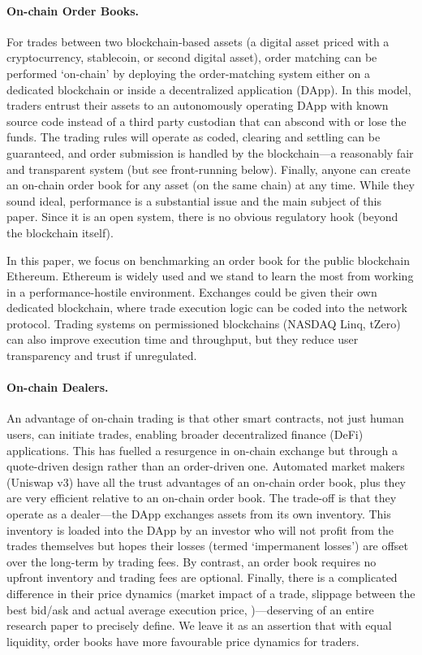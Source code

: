 \paragraph{On-chain Order Books.} For trades between two blockchain-based assets (\eg a digital asset priced with a cryptocurrency, stablecoin, or second digital asset), order matching can be performed `on-chain' by deploying the order-matching system either on a dedicated blockchain or inside a decentralized application (DApp). In this model, traders entrust their assets to an autonomously operating DApp with known source code instead of a third party custodian that can abscond with or lose the funds. The trading rules will operate as coded, clearing and settling can be guaranteed, and order submission is handled by the blockchain---a reasonably fair and transparent system (but see front-running below). Finally, anyone can create an on-chain order book for any asset (on the same chain) at any time. While they sound ideal, performance is a substantial issue and the main subject of this paper. Since it is an open system, there is no obvious regulatory hook (beyond the blockchain itself). 

In this paper, we focus on benchmarking an order book for the public blockchain Ethereum. Ethereum is widely used and we stand to learn the most from working in a performance-hostile environment. Exchanges could be given their own dedicated blockchain, where trade execution logic can be coded into the network protocol. Trading systems on permissioned blockchains (\eg NASDAQ Linq, tZero) can also improve execution time and throughput, but they reduce user transparency and trust if unregulated.

\paragraph{On-chain Dealers.} An advantage of on-chain trading is that other smart contracts, not just human users, can initiate trades, enabling broader decentralized finance (DeFi) applications. This has fuelled a resurgence in on-chain exchange but through a quote-driven design rather than an order-driven one. Automated market makers  (\eg Uniswap v3) have all the trust advantages of an on-chain order book, plus they are very efficient relative to an on-chain order book. The trade-off is that they operate as a dealer---the DApp exchanges assets from its own inventory. This inventory is loaded into the DApp by an investor who will not profit from the trades themselves but hopes their losses (termed `impermanent losses') are offset over the long-term by trading fees. By contrast, an order book requires no upfront inventory and trading fees are optional. Finally, there is a complicated difference in their price dynamics (\eg market impact of a trade, slippage between the best bid/ask and actual average execution price, \etc)---deserving of an entire research paper to precisely define. We leave it as an assertion that with equal liquidity, order books have more favourable price dynamics for traders.

